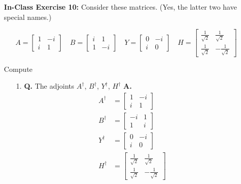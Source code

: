 \documentclass[main.tex]{subfiles}
\begin{document}
\begin{enumerate}
\begin{enumerate}
    \end{enumerate}

\item[] \textbf{In-Class Exercise 10:} Consider these matrices. (Yes, the latter two have special names.)

    $$
    A=\left[\begin{array}{cc}
    1 & -i \\
    i & 1
    \end{array}\right] \quad B=\left[\begin{array}{cc}
    i & 1 \\
    1 & -i
    \end{array}\right] \quad Y=\left[\begin{array}{cc}
    0 & -i \\
    i & 0
    \end{array}\right] \quad H=\left[\begin{array}{cc}
    \frac{1}{\sqrt{2}} & \frac{1}{\sqrt{2}} \\
    \frac{1}{\sqrt{2}} & -\frac{1}{\sqrt{2}}
    \end{array}\right]
    $$
    
    Compute
    
    \begin{enumerate}
        \item[1.] \textbf{Q.} The adjoints $A^{\dagger}$, $B^{\dagger}$, $Y^{\dagger}$, $H^{\dagger}$ \textbf{A.}
        \begin{align*}
            A^{\dagger} & = \left[\begin{array}{cc} 1 & -i \\ i & 1 \end{array}\right]\\
            B^{\dagger} & = \left[\begin{array}{cc} -i & 1 \\ 1 & i \end{array}\right]\\
            Y^{\dagger} & = \left[\begin{array}{cc} 0 & -i \\ i & 0 \end{array}\right]\\
            H^{\dagger} & = \left[\begin{array}{cc} \frac{1}{\sqrt{2}} & \frac{1}{\sqrt{2}} \\ \frac{1}{\sqrt{2}} & -\frac{1}{\sqrt{2}} \end{array} \right]
        \end{align*}
        

\end{enumerate}
\end{enumerate}
\end{document}
